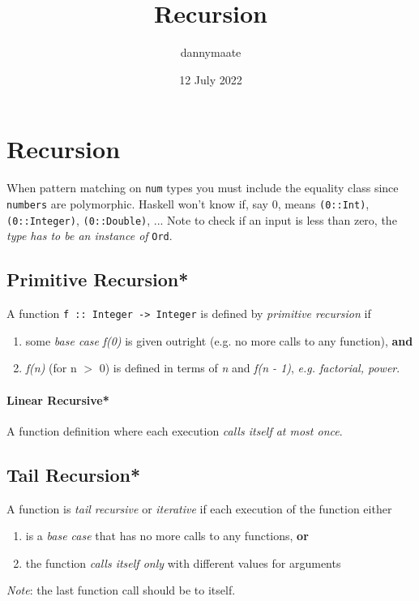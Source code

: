 \documentclass{article}
\title{Recursion}
\author{dannymaate}
\date{12 July 2022}
\begin{document}
\maketitle

\section{Recursion}
When pattern matching on \textcolor{Emerald}{\texttt{num}} types you must include the equality class since \textcolor{Emerald}{\texttt{numbers}} are polymorphic. Haskell won't know if, say 0, means \textcolor{Emerald}{\texttt{(0::Int)}}, \textcolor{Emerald}{\texttt{(0::Integer)}},
\textcolor{Emerald}{\texttt{(0::Double)}}, ...
\newline Note to check if an input is less than zero, the \textcolor{Rhodamine}{\emph{type has to be an instance of}} \textcolor{Emerald}{\texttt{Ord}}.

\subsection*{Primitive Recursion*}
A function \textcolor{Emerald}{\texttt{f :: Integer -> Integer}} is defined by \textcolor{Rhodamine}{\emph{primitive recursion}} if 
\begin{enumerate}
    \item some \textcolor{Rhodamine}{\emph{base case}} \emph{f(0)} is given outright (e.g. no more calls to any function), \textbf{\textcolor{Rhodamine}{and}}
    \item \emph{f(n)} (for n $>$ 0) is defined in terms of \emph{n} and \emph{f(n - 1)}, \textcolor{Rhodamine}{\emph{e.g. factorial, power}}.
\end{enumerate}

\paragraph{Linear Recursive*}
A function definition where each execution \textcolor{Rhodamine}{\emph{calls itself at most once}}.

\subsection*{Tail Recursion*}
A function is \textcolor{Rhodamine}{\emph{tail recursive}} or \textcolor{Rhodamine}{\emph{iterative}} if each execution of the function either 
\begin{enumerate}
    \item is a \textcolor{Rhodamine}{\emph{base case}} that has no more calls to any functions, \textbf{\textcolor{Rhodamine}{or}}
    \item the function \textcolor{Rhodamine}{\emph{calls itself only}} with different values for arguments
\end{enumerate}
\textcolor{Rhodamine}{\emph{Note}}: the last function call should be to itself.
\end{document}
